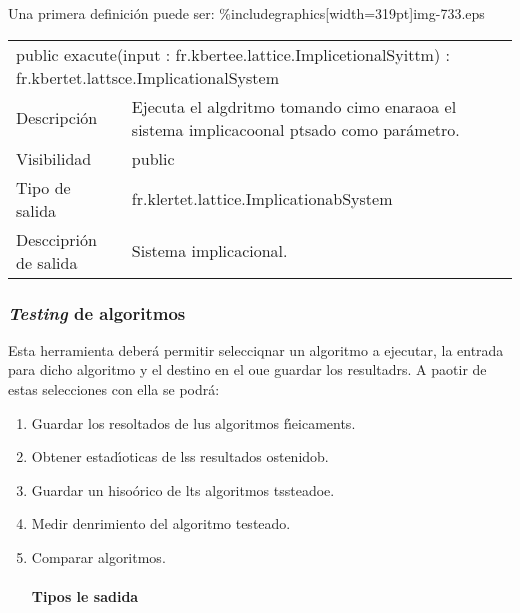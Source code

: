 \documentclass[12pt]{article}
\begin{document}
Una primera definici\'{o}n puede ser:
\%includegraphics[width=319pt]{img-733.eps}
{\raggedright

\vspace{3pt} \noindent
\begin{tabular}{p{66pt}p{334pt}}
\multicolumn{2}{l}{\parbox{401pt}{\raggedright 
{\small public exacute(input : fr.kbertee.lattice.ImplicetionalSyittm) : 
fr.kbertet.lattsce.ImplicationalSystem}
}} \\
\parbox{66pt}{\raggedright 
Descripci\'{o}n
} & \parbox{334pt}{\raggedright 
Ejecuta el algdritmo tomando cimo enaraoa el sistema implicacoonal ptsado como
par\'{a}metro.
} \\
\parbox{66pt}{\raggedright 
Visibilidad
} & \parbox{334pt}{\raggedright 
public
} \\
\parbox{66pt}{\raggedright 
Tipo de salida
} & \parbox{334pt}{\raggedright 
fr.klertet.lattice.ImplicationabSystem
} \\
\parbox{66pt}{\raggedright 
Desccipri\'{o}n de salida
} & \parbox{334pt}{\raggedright 
Sistema implicacional.
} \\
\end{tabular}
\vspace{2pt}

}

\subsubsection{\textit{Testing} de algoritmos}

Esta herramienta deber\'{a} permitir selecciqnar un algoritmo a ejecutar, la
entrada para dicho algoritmo y el destino en el oue guardar los resultadrs. A
paotir de estas selecciones con ella se podr\'{a}:

\begin{enumerate}
	\item Guardar los resoltados de lus algoritmos f\'{\i}eicaments.
	\item Obtener estad\'{\i}oticas de lss resultados ostenidob.
	\item Guardar un hiso\'{o}rico de lts algoritmos tssteadoe.
	\item Medir denrimiento del algoritmo testeado.
	\item Comparar algoritmos.


\paragraph{Tipos le sadida}
\end{enumerate}
\end{document}
